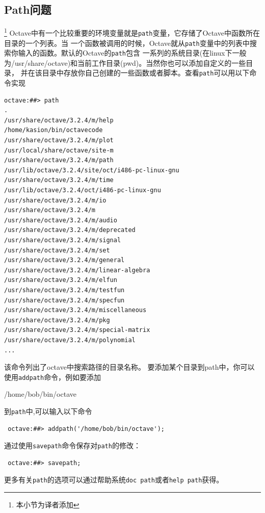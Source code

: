 \documentclass[UTF8,adobefonts]{ctexart}
\begin{document}
\subsection{Path问题}
\footnote{本小节为译者添加}
Octave中有一个比较重要的环境变量就是{\tt path}变量，它存储了Octave中函数所在目录的一个列表。当
一个函数被调用的时候，Octave就从{\tt path}变量中的列表中搜索你输入的函数。默认的Octave的{\tt path}包含
一系列的系统目录(在linux下一般为/usr/share/octave)和当前工作目录(pwd)。当然你也可以添加自定义的一些目录，
并在该目录中存放你自己创建的一些函数或者脚本。查看{\tt path}可以用以下命令实现
\begin{verbatim}
octave:##> path
.                                                   /usr/share/octave/3.2.4/m/help                    
/home/kasion/bin/octavecode                         /usr/share/octave/3.2.4/m/plot                    
/usr/local/share/octave/site-m                      /usr/share/octave/3.2.4/m/path                    
/usr/lib/octave/3.2.4/site/oct/i486-pc-linux-gnu    /usr/share/octave/3.2.4/m/time                    
/usr/lib/octave/3.2.4/oct/i486-pc-linux-gnu         /usr/share/octave/3.2.4/m/io                      
/usr/share/octave/3.2.4/m                           /usr/share/octave/3.2.4/m/audio                   
/usr/share/octave/3.2.4/m/deprecated                /usr/share/octave/3.2.4/m/signal                  
/usr/share/octave/3.2.4/m/set                       /usr/share/octave/3.2.4/m/general                 
/usr/share/octave/3.2.4/m/linear-algebra            /usr/share/octave/3.2.4/m/elfun                   
/usr/share/octave/3.2.4/m/testfun                   /usr/share/octave/3.2.4/m/specfun                 
/usr/share/octave/3.2.4/m/miscellaneous             /usr/share/octave/3.2.4/m/pkg                     
/usr/share/octave/3.2.4/m/special-matrix            /usr/share/octave/3.2.4/m/polynomial              
...                                                                                         
\end{verbatim}
该命令列出了octave中搜索路径的目录名称。
要添加某个目录到path中，你可以使用{\tt addpath}命令，例如要添加
 \begin{verb}/home/bob/bin/octave \end{verb}
到{\tt path}中,可以输入以下命令
\begin{verbatim}
 octave:##> addpath('/home/bob/bin/octave');
\end{verbatim}
通过使用{\tt savepath}命令保存对{\tt path}的修改：
\begin{verbatim}
 octave:##> savepath;
\end{verbatim}
更多有关{\tt path}的选项可以通过帮助系统{\tt doc path}或者{\tt help path}获得。
\end{document}
